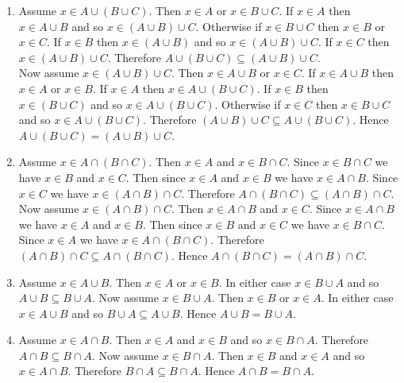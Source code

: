 \documentclass[12pt]{book}
\begin{document}
\begin{enumerate}
\item Assume $x \in A \cup (B \cup C)$. Then $x \in A$ or $x \in B \cup C$. If $x \in A$ then $x \in A \cup B$ and so $x \in (A \cup B) \cup C$. Otherwise if $x \in B \cup C$ then $x \in B$ or $x \in C$. If $x \in B$ then $x \in (A \cup B)$ and so $x \in (A \cup B) \cup C$. If $x \in C$ then $x \in (A \cup B) \cup C$. Therefore $A \cup (B \cup C) \subseteq (A \cup B) \cup C$.\\ Now assume $x \in (A \cup B) \cup C$. Then $x \in A \cup B$ or $x \in C$. If $x \in A \cup B$ then $x \in A$ or $x \in B$. If $x \in A$ then $x \in A \cup (B \cup C)$. If $x \in B$ then $x \in (B \cup C)$ and so $x \in A \cup (B \cup C)$. Otherwise if $x \in C$ then $x \in B \cup C$ and so $x \in A \cup (B \cup C)$. Therefore $(A \cup B) \cup C \subseteq A \cup (B \cup C)$. Hence $A \cup (B \cup C) = (A \cup B) \cup C$.
\renewcommand{\labelenumi}{\arabic{enumi}'.}
\setcounter{enumi}{0}
\item Assume $x \in A \cap (B \cap C)$. Then $x \in A$ and $x \in B \cap C$. Since $x \in B \cap C$ we have $x \in B$ and $x \in C$. Then since $x \in A$ and $x \in B$ we have $x \in A \cap B$. Since $x \in C$ we have $x \in (A \cap B) \cap C$. Therefore $A \cap (B \cap C) \subseteq (A \cap B) \cap C$.\\ Now assume $x \in (A \cap B) \cap C$. Then $x \in A \cap B$ and $x \in C$. Since $x \in A \cap B$ we have $x \in A$ and $x \in B$. Then since $x \in B$ and $x \in C$ we have $x \in B \cap C$. Since $x \in A$ we have $x \in A \cap (B \cap C)$. Therefore $(A \cap B) \cap C \subseteq A \cap (B \cap C)$. Hence $A \cap (B \cap C) = (A \cap B) \cap C$.
\renewcommand{\labelenumi}{\arabic{enumi}.}
\setcounter{enumi}{1}
\item Assume $x \in A \cup B$. Then $x \in A$ or $x \in B$. In either case $x \in B \cup A$ and so $A \cup B \subseteq B \cup A$. Now assume $x \in B \cup A$. Then $x \in B$ or $x \in A$. In either case $x \in A \cup B$ and so $B \cup A \subseteq A \cup B$. Hence $A \cup B = B \cup A$.
\renewcommand{\labelenumi}{\arabic{enumi}'.}
\setcounter{enumi}{1}
\item Assume $x \in A \cap B$. Then $x \in A$ and $x \in B$ and so $x \in B \cap A$. Therefore $A \cap B \subseteq B \cap A$. Now assume $x \in B \cap A$. Then $x \in B$ and $x \in A$ and so $x \in A \cap B$. Therefore $B \cap A \subseteq B \cap A$. Hence $A \cap B = B \cap A$.
\renewcommand{\labelenumi}{\arabic{enumi}.}
\setcounter{enumi}{2}

\end{enumerate}
\end{document}
